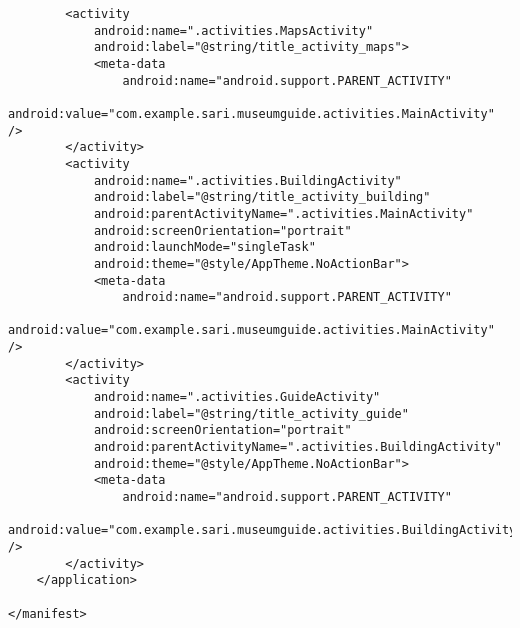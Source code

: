 \begin{lstlisting}
        <activity
            android:name=".activities.MapsActivity"
            android:label="@string/title_activity_maps">
            <meta-data
                android:name="android.support.PARENT_ACTIVITY"
                android:value="com.example.sari.museumguide.activities.MainActivity" />
        </activity>
        <activity
            android:name=".activities.BuildingActivity"
            android:label="@string/title_activity_building"
            android:parentActivityName=".activities.MainActivity"
            android:screenOrientation="portrait"
            android:launchMode="singleTask"
            android:theme="@style/AppTheme.NoActionBar">
            <meta-data
                android:name="android.support.PARENT_ACTIVITY"
                android:value="com.example.sari.museumguide.activities.MainActivity" />
        </activity>
        <activity
            android:name=".activities.GuideActivity"
            android:label="@string/title_activity_guide"
            android:screenOrientation="portrait"
            android:parentActivityName=".activities.BuildingActivity"
            android:theme="@style/AppTheme.NoActionBar">
            <meta-data
                android:name="android.support.PARENT_ACTIVITY"
                android:value="com.example.sari.museumguide.activities.BuildingActivity" />
        </activity>
    </application>

</manifest>
\end{lstlisting}
\newpage
